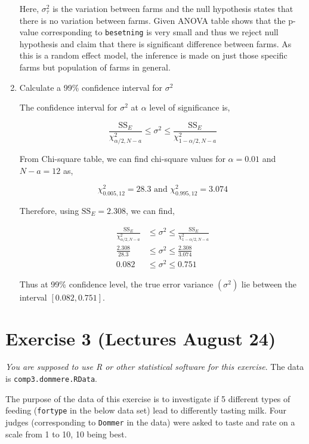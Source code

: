 \documentclass[11pt,a4paper]{article}
\begin{document}
\begin{enumerate}
  Here, \(\sigma_\tau^2\) is the variation between farms and the null
  hypothesis states that there is no variation between farms. Given
  ANOVA table shows that the p-value corresponding to \texttt{besetning}
  is very small and thus we reject null hypothesis and claim that there
  is significant difference between farms. As this is a random effect
  model, the inference is made on just those specific farms but
  population of farms in general.
\item
  Calculate a 99\% confidence interval for \(\sigma^2\)

  The confidence interval for \(\sigma^2\) at \(\alpha\) level of
  significance is,

  \[\frac{\text{SS}_E}{\chi^2_{\alpha/2, N-a}} \le \sigma^2 \le \frac{\text{SS}_E}{\chi^2_{1 - \alpha/2, N-a}}\]

  From Chi-square table, we can find chi-square values for
  \(\alpha = 0.01\) and \(N-a = 12\) as,

  \[
  \chi^2_{0.005, 12} = 28.3 \text{ and } 
  \chi^2_{0.995, 12} = 3.074
  \]

  Therefore, using \(\text{SS}_E = 2.308\), we can find,

  \[
  \begin{aligned}
  \frac{\text{SS}_E}{\chi^2_{\alpha/2, N-a}} &\le \sigma^2 \le \frac{\text{SS}_E}{\chi^2_{1 - \alpha/2, N-a}} \\
  \frac{2.308}{28.3} &\le \sigma^2 \le \frac{2.308}{3.074} \\
  0.082 &\le \sigma^2 \le 0.751
  \end{aligned}
  \]

  Thus at 99\% confidence level, the true error variance \((\sigma^2)\)
  lie between the interval \(\left[0.082, 0.751\right]\).
\end{enumerate}

\section{Exercise 3 (Lectures August
24)}\label{exercise-3-lectures-august-24}

\emph{You are supposed to use R or other statistical software for this
exercise}. The data is \texttt{comp3.dommere.RData}.

The purpose of the data of this exercise is to investigate if 5
different types of feeding (\texttt{fortype} in the below data set) lead
to differently tasting milk. Four judges (corresponding to
\texttt{Dommer} in the data) were asked to taste and rate on a scale
from 1 to 10, 10 being best.
\end{document}
